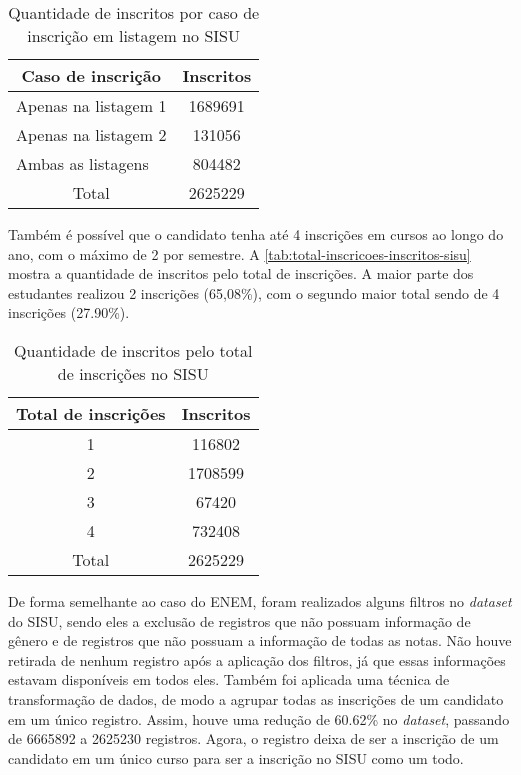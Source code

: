 \begin{table}[h]
  \begin{tabular}{lc}
  \hline
  \multicolumn{1}{c}{\textbf{Caso de inscrição}}        & \textbf{Inscritos} \\ \hline
  Apenas na listagem 1  & 1689691                          \\ \hline
  Apenas na listagem 2  & 131056                           \\ \hline
  Ambas as listagens & 804482                           \\ \hline
  \multicolumn{1}{c}{Total}                & 2625229                          \\ \hline
  \end{tabular}
  \caption{Quantidade de inscritos por caso de inscrição em listagem no SISU}
  \label{tab:caso-inscricao-sisu}
  \end{table}

Também é possível que o candidato tenha até 4 inscrições em cursos ao longo do ano, com o máximo de 2 por semestre. A \autoref{tab:total-inscricoes-inscritos-sisu} mostra a quantidade de inscritos pelo total de inscrições. A maior parte dos estudantes realizou 2 inscrições (65,08\%), com o segundo maior total sendo de 4 inscrições (27.90\%). 

\begin{table}[]
  \centering
  \begin{tabular}{cc}
  \hline
  \textbf{Total de inscrições} & \textbf{Inscritos} \\ \hline
  1                   & 116802    \\ \hline
  2                   & 1708599   \\ \hline
  3                   & 67420     \\ \hline
  4                   & 732408    \\ \hline
  Total               & 2625229   \\ \hline
  \end{tabular}
  \caption{Quantidade de inscritos pelo total de inscrições no SISU}
  \label{tab:total-inscricoes-inscritos-sisu}
  \end{table}

De forma semelhante ao caso do ENEM, foram realizados alguns filtros no \textit{dataset} do SISU, sendo eles a exclusão de registros que não possuam informação de gênero e de registros que não possuam a informação de todas as notas. Não houve retirada de nenhum registro após a aplicação dos filtros, já que essas informações estavam disponíveis em todos eles. Também foi aplicada uma técnica de transformação de dados, de modo a agrupar todas as inscrições de um candidato em um único registro. Assim, houve uma redução de 60.62\% no \textit{dataset}, passando de 6665892 a 2625230 registros. Agora, o registro deixa de ser a inscrição de um candidato em um único curso para ser a inscrição no SISU como um todo.

